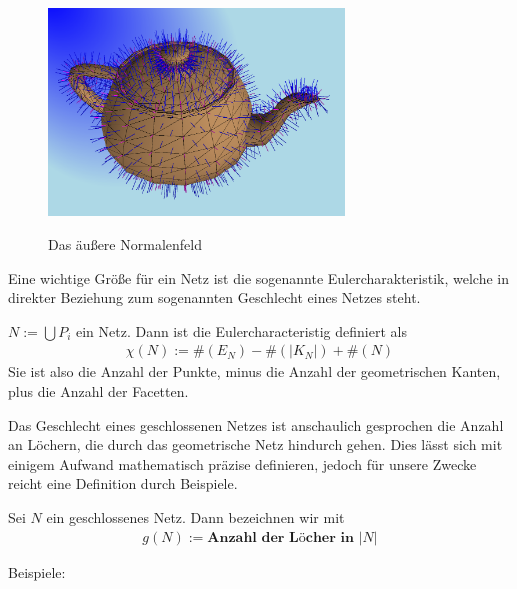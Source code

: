 \begin{figure}[H]
    \centering
    \includegraphics[width=0.7\textwidth]{images/teapot-normals.png}
    \label{fig:outer-normals}
    \caption{Das äußere Normalenfeld}
\end{figure}
Eine wichtige Größe für ein Netz ist die sogenannte Eulercharakteristik, welche in direkter Beziehung zum sogenannten Geschlecht eines Netzes steht.

\begin{Definition}
$N:= \bigcup P_i$ ein Netz. Dann ist die Eulercharacteristig definiert als
\begin{align*}
\chi(N):= \#(E_N) - \#(|K_N|) + \#(N) 
\end{align*}
Sie ist also die Anzahl der  Punkte, minus die Anzahl der geometrischen Kanten, plus die Anzahl der Facetten.
\end{Definition}

Das Geschlecht eines geschlossenen Netzes ist anschaulich gesprochen die Anzahl an Löchern, die durch das geometrische Netz hindurch gehen. Dies lässt sich mit einigem Aufwand mathematisch präzise definieren, jedoch für unsere Zwecke reicht eine Definition durch Beispiele.
\begin{Definition}
Sei $N$ ein geschlossenes Netz. Dann bezeichnen wir mit
\begin{align*}
g(N):= \textbf{Anzahl der Löcher in } |N|
\end{align*}
\end{Definition}
Beispiele:

